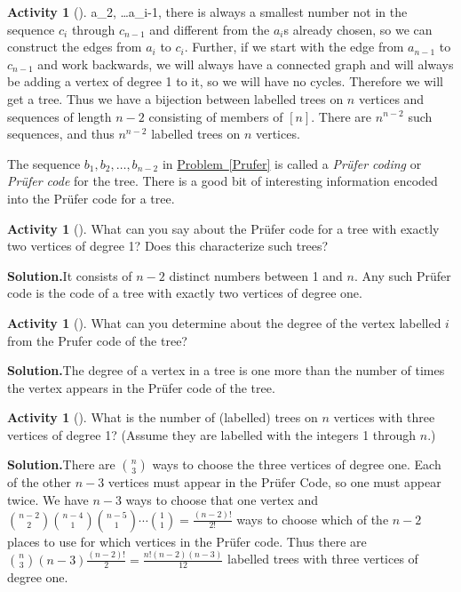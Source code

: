 \documentclass[10pt,]{book}
\theoremstyle{plain}
\theoremstyle{definition}
\newtheorem{activity}[project]{Activity}
\numberwithin{equation}{chapter}
\begin{document}
\begin{activity}[]
a_2, \ldots a_{i-1}\), there is always a smallest number not in the sequence \(c_i\) through \(c_{n-1}\) and different from the \(a_i\)s already chosen, so we can construct the edges from \(a_i\) to \(c_i\). Further, if we start with the edge from \(a_{n-1}\) to \(c_{n-1}\) and work backwards, we will always have a connected graph and will always be adding a vertex of degree 1 to it, so we will have no cycles. Therefore we will get a tree. Thus we have a bijection between labelled trees on \(n\) vertices and sequences of length \(n-2\) consisting of members of \([n]\). There are \(n^{n-2}\) such sequences, and thus \(n^{n-2}\) labelled trees on \(n\) vertices.%
\end{activity}
The sequence \(b_1,b_2,\ldots, b_{n-2}\) in \hyperref[Prufer]{Problem~\ref{Prufer}} is called a \emph{Prüfer coding} or \emph{Prüfer code} for the tree. There is a good bit of interesting information encoded into the Prüfer code for a tree.%
\begin{activity}[]\label{activity-104}
What can you say about the Prüfer code for a tree with exactly two vertices of degree 1? Does this characterize such trees?%
\par\medskip\noindent%
\textbf{Solution.}\quad It consists of \(n-2\) distinct numbers between 1 and \(n\). Any such Prüfer code is the code of a tree with exactly two vertices of degree one.%
\end{activity}
\begin{activity}[]\label{activity-105}
What can you determine about the degree of the vertex labelled \(i\) from the Prufer code of the tree?%
\par\medskip\noindent%
\textbf{Solution.}\quad The degree of a vertex in a tree is one more than the number of times the vertex appears in the Prüfer code of the tree.%
\end{activity}
\begin{activity}[]\label{activity-106}
What is the number of (labelled) trees on \(n\) vertices with three vertices of degree 1? (Assume they are labelled with the integers 1 through \(n\).)%
\par\medskip\noindent%
\textbf{Solution.}\quad There are \(\binom{n}{3}\) ways to choose the three vertices of degree one. Each of the other \(n-3\) vertices must appear in the Prüfer Code, so one must appear twice. We have \(n-3\) ways to choose that one vertex and \(\binom{n-2}{2}\binom{n-4}{1}\binom{n-5}{1}\cdots\binom{1}{1} =\frac{(n-2)!}{2!}\) ways to choose which of the \(n-2\) places to use for which vertices in the Prüfer code. Thus there are \(\binom{n}{3}(n-3)\frac{(n-2)!}{2}= \frac{n!(n-2)(n-3)}{12}\) labelled trees with three vertices of degree one.%
\end{activity}
\typeout{************************************************}
\typeout{************************************************}
\end{document}
